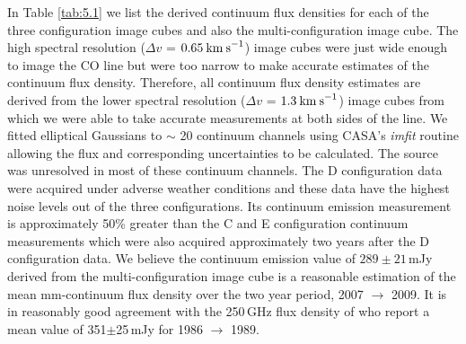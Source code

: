 In Table \ref{tab:5.1} we list the derived continuum flux densities for each of the three configuration image cubes and also the multi-configuration image cube. The high spectral resolution ($\Delta v$ = $0.65\>{\rm km\>s}^{-1}$) image cubes were just wide enough to image the CO line but were too narrow to make accurate estimates of the continuum flux density. Therefore, all continuum flux density estimates are derived from the lower spectral resolution ($\Delta v$ = $1.3\>{\rm km\>s}^{-1}$) image cubes from which we were able to take accurate measurements at both sides of the line. We fitted elliptical Gaussians to $\sim$ 20 continuum channels using CASA's \textit{imfit} routine allowing the flux and corresponding uncertainties to be calculated. The source was unresolved in most of these continuum channels. The D configuration data were acquired under adverse weather conditions and these data have the highest noise levels out of the three configurations. Its continuum emission measurement is approximately 50\% greater than the C and E configuration continuum measurements which were also acquired approximately two years after the D configuration data.  We believe the continuum emission value of $289 \pm 21$\,mJy derived from the multi-configuration image cube is a reasonable estimation of the mean mm-continuum flux density over the two year period, 2007 $\rightarrow$ 2009. It is in reasonably good agreement with the 250\,GHz flux density of \cite{altenhoff_1994} who report a mean value of 351$\pm$25\,mJy for 1986 $\rightarrow$ 1989.


